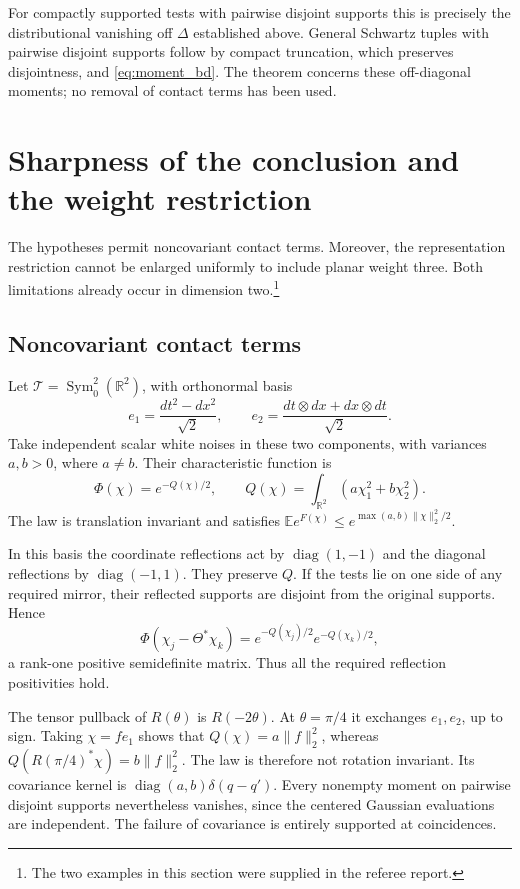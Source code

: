 \documentclass[11pt, letterpaper, reqno]{amsart}
\theoremstyle{definition}
\theoremstyle{remark}
\newcommand{\bbE}{\mathbb{E}}
\newcommand{\bbR}{\mathbb{R}}
\newcommand{\calT}{\mathcal{T}}
\begin{document}
For compactly supported tests with pairwise disjoint supports this
is precisely the distributional vanishing off $\Delta$ established
above. General Schwartz tuples with pairwise disjoint supports
follow by compact truncation, which preserves disjointness, and
\eqref{eq:moment_bd}. The theorem concerns these
off-diagonal moments; no removal of contact terms has been used.


\section{Sharpness of the conclusion and the weight restriction}
\label{sec:sharpness-examples}
\enlargethispage{2pt}

The hypotheses permit noncovariant contact terms. Moreover, the
representation restriction cannot be enlarged uniformly to include
planar weight three. Both limitations already occur in dimension two.\footnote{The two
examples in this section were supplied in the referee report.}

\subsection{Noncovariant contact terms}

Let $\calT=\operatorname{Sym}^2_0(\bbR^2)$, with orthonormal basis
\[
 e_1=\frac{dt^2-dx^2}{\sqrt2},\qquad
 e_2=\frac{dt\otimes dx+dx\otimes dt}{\sqrt2}.
\]
Take independent scalar white noises in these two components, with
variances $a,b>0$, where $a\ne b$. Their characteristic function is
\[
 \Phi(\chi)=e^{-Q(\chi)/2},\qquad
 Q(\chi)=\int_{\bbR^2}(a\chi_1^2+b\chi_2^2).
\]
The law is translation invariant and satisfies
$\bbE e^{F(\chi)}\leq e^{\max(a,b)\|\chi\|_2^2/2}$.

In this basis the coordinate reflections act by
$\operatorname{diag}(1,-1)$ and the diagonal reflections by
$\operatorname{diag}(-1,1)$. They preserve $Q$. If the tests lie on
one side of any required mirror, their reflected supports are disjoint
from the original supports. Hence
\[
 \Phi(\chi_j-\Theta^*\chi_k)
 =e^{-Q(\chi_j)/2}e^{-Q(\chi_k)/2},
\]
a rank-one positive semidefinite matrix. Thus all the required
reflection positivities hold.

The tensor pullback of $R(\theta)$ is $R(-2\theta)$. At
$\theta=\pi/4$ it exchanges $e_1,e_2$, up to sign. Taking
$\chi=f e_1$ shows that $Q(\chi)=a\|f\|_2^2$, whereas
$Q(R(\pi/4)^*\chi)=b\|f\|_2^2$. The law is therefore not rotation
invariant. Its covariance kernel is
$\operatorname{diag}(a,b)\delta(q-q')$.
Every nonempty moment on pairwise disjoint supports nevertheless
vanishes, since the centered Gaussian evaluations are independent.
The failure of covariance is entirely supported at coincidences.
\end{document}
